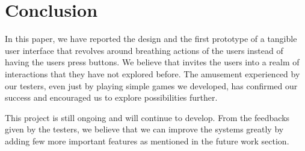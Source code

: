 \section{Conclusion}\label{sec:conc}

In this paper, we have reported the design and the first prototype of a tangible user interface that revolves around breathing actions of the users instead of having the users press buttons. We believe that \tube invites the users into a realm of interactions that they have not explored before. The amusement experienced by our testers, even just by playing simple games we developed, has confirmed our success and encouraged us to explore \tube possibilities further.

This project is still ongoing and will continue to develop. From the feedbacks given by the testers, we believe that we can improve the systems greatly by adding few more important features as mentioned in the future work section.

